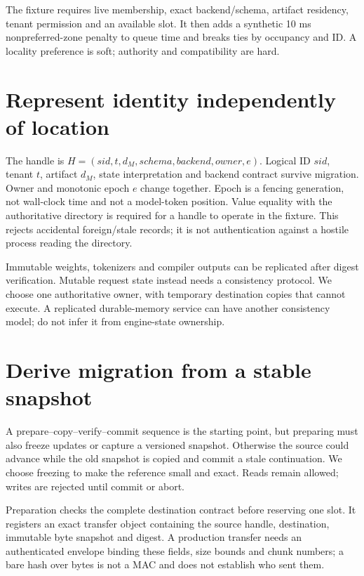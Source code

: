 The fixture requires live membership, exact backend/schema, artifact residency,
tenant permission and an available slot. It then adds a synthetic 10 ms
nonpreferred-zone penalty to queue time and breaks ties by occupancy and ID.
A locality preference is soft; authority and compatibility are hard.

\section{Represent identity independently of location}
\label{evod46:owner}
The handle is $H=(sid,t,d_M,schema,backend,owner,e)$.
Logical ID $sid$, tenant $t$, artifact $d_M$, state interpretation and backend
contract survive migration. Owner and monotonic epoch $e$ change together.
Epoch is a fencing generation, not wall-clock time and not a model-token
position. Value equality with the authoritative directory is required for a
handle to operate in the fixture. This rejects accidental foreign/stale
records; it is not authentication against a hostile process reading the directory.

Immutable weights, tokenizers and compiler outputs can be replicated after
digest verification. Mutable request state instead needs a consistency
protocol. We choose one authoritative owner, with temporary destination copies
that cannot execute. A replicated durable-memory service can have another
consistency model; do not infer it from engine-state ownership.


\section{Derive migration from a stable snapshot}
\label{evod46:migrate}
A prepare--copy--verify--commit sequence is the starting point, but preparing must
also freeze updates or capture a versioned snapshot. Otherwise the source
could advance while the old snapshot is copied and commit a stale continuation.
We choose freezing to make the reference small and exact. Reads remain allowed;
writes are rejected until commit or abort.

Preparation checks the complete destination contract before reserving one
slot. It registers an exact transfer object containing the source handle,
destination, immutable byte snapshot and digest. A production transfer needs
an authenticated envelope binding these fields, size bounds and chunk numbers;
a bare hash over bytes is not a MAC and does not establish who sent them.

